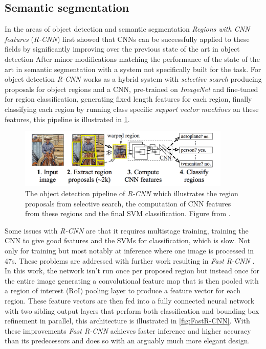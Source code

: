 \documentclass{kththesis}
\newcommand{\bibentry}[1]{\parencite{#1}}
\begin{document}
\subsection{Semantic segmentation}
In the areas of object detection and semantic segmentation \emph{Regions
  with CNN features} (\emph{R-CNN}) \bibentry{girshick2014rich} 
first showed that CNNs can be successfully applied to these fields by
significantly improving over the previous state of the art in object detection
\bibentry{ren2013histograms} After minor modifications matching the
performance of the state of the art in semantic segmentation
\bibentry{carreira2012semantic} with a system not specifically built for the
task. For object detection \emph{R-CNN} works as a hybrid system with
\emph{selective search} \bibentry{uijlings2013selective} producing proposals for
object regions and a CNN, pre-trained on \emph{ImageNet}
\bibentry{deng2009imagenet} and fine-tuned for region classification, generating
fixed length features for each region, finally classifying each region by
running class specific \emph{support vector machines}
\bibentry{boser1992training} on these features, this pipeline is illustrated in \cref{fig:R-CNN}.

\begin{figure}[h]
  \centering
  \includegraphics[width=0.9\textwidth]{R-CNN}
  \caption{The object detection pipeline of \textit{R-CNN} which illustrates the
  region proposals from selective search, the computation of CNN features from
  these regions and the final SVM classification. Figure from \textcite{girshick2014rich}.}
  \label{fig:R-CNN}
  \end{figure}

Some issues with \emph{R-CNN}
are that it requires multistage training, training the CNN to give good
features and the SVMs for classification, which is slow. Not only for training
but most notably at inference where one image is processed in 47s.
These problems are addressed with further work resulting in \emph{Fast R-CNN}
\bibentry{girshick2015fast}. In this work, the network isn't run once per proposed region but
instead once for the entire image generating a convolutional feature map that
is then pooled with a region of interest (RoI) pooling layer to produce a
feature vector for each region. These feature vectors are then fed into a fully
connected neural network with two sibling output layers that perform both
classification and bounding box refinement in parallel, this architecture is
illustrated in \cref{fig:FastR-CNN}. With these improvements
\emph{Fast R-CNN} achieves faster inference and higher accuracy than its
predecessors and does so with an arguably much more elegant design.
\end{document}
